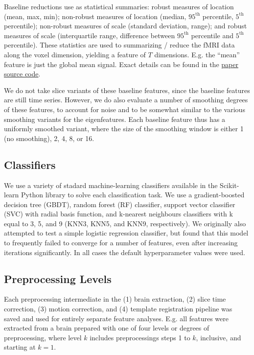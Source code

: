 \documentclass[12pt]{spieman}  %
\begin{document}
\begin{spacing}{2}
Baseline reductions use as statistical summaries: robust measures of location
(mean, max, min); non-robust measures of location (median, \(95^{\text{th}}\)
percentile, \(5^{\text{th}}\) percentile); non-robust measures of scale
(standard deviation, range); and robust measures of scale (interquartile range,
difference between \(95^{\text{th}}\) percentile and \(5^{\text{th}}\)
percentile). These statistics are used to summarizing / reduce the fMRI data
along the voxel dimension, yielding a feature of \(T\) dimensions. E.g. the ``mean''
feature is just the global mean signal. Exact details can be found in the
\href{https://github.com/DM-Berger/random-matrix-fmri/blob/master/code/rmt/enumerables.py#L51-L69}{paper
source code}.

We do not take slice variants of these baseline features, since the baseline
features are still time series. However, we do also evaluate a number of
smoothing degrees of these features, to account for noise and to be somewhat
similar to the various smoothing variants for the eigenfeatures. Each baseline
feature thus has a uniformly smoothed variant, where the size of the smoothing
window is either 1 (no smoothing), 2, 4, 8, or 16.


\subsection{Classifiers}

We use a variety of stadard machine-learning classifiers available in the
Scikit-learn\cite{pedregosaScikitlearnMachineLearning2011} Python library to
solve each classification task. We use a gradient-boosted decision tree (GBDT),
random forest (RF) classifier, support vector classifier (SVC) with radial
basis function, and k-nearest neighbours classifiers with k equal to 3, 5, and
9 (KNN3, KNN5, and KNN9, respectively). We originally also attempted to test a
simple logistic regression classifier, but found that this model to frequently
failed to converge for a number of features, even after increasing iterations
significantly. In all cases the default hyperparameter values were used.

\subsection{Preprocessing Levels}

Each preprocessing intermediate in the (1) brain extraction, (2) slice time
correction, (3) motion correction, and (4) template registration pipeline was
saved and used for entirely separate feature analyses. E.g. all features were
extracted from a brain prepared with one of four levels or degrees of
preprocessing, where level \(k\) includes preprocessings steps 1 to \(k\),
inclusive, and starting at \(k = 1\).


\end{spacing}
\end{document}

